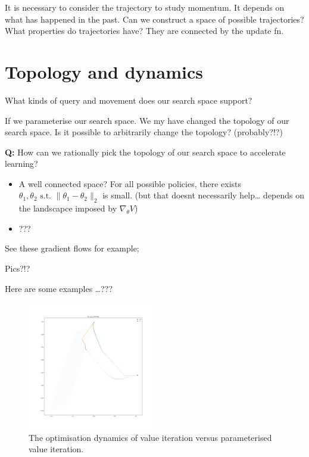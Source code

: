 It is necessary to consider the trajectory to study momentum. It depends
on what has happened in the past. Can we construct a space of possible
trajectories? What properties do trajectories have? They are connected
by the update fn.


\section{Topology and dynamics}

What kinds of query and movement does our search space support?

If we parameterise our search space. We my have changed the topology of our search space.
Is it possible to arbitrarily change the topology? (probably?!?)

\textbf{Q:} How can we rationally pick the topology of our search space
to accelerate learning?

\begin{itemize}
\item
  A well connected space? For all possible policies, there exists
  \(\theta_1, \theta_2 \text{ s.t. } \parallel \theta_1- \theta_2\parallel_2\)
  is small. (but that doesnt necessarily help\ldots{} depends on the
  landscapce imposed by \(\nabla_{\theta} V\))
\item
  ???
\end{itemize}

See these gradient flows for example;

Pics?!?

Here are some examples \ldots{}???

\begin{figure}
\centering
\includegraphics[width=0.5\textwidth,height=0.5\textheight]{../../pictures/figures/vi-vs-pvi.png}
\caption{The optimisation dynamics of value iteration versus parameterised value iteration.}
\end{figure}

